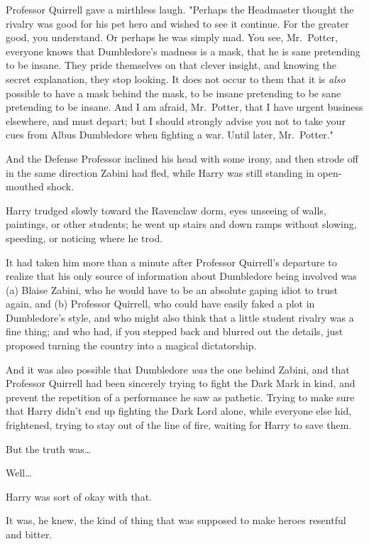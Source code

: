 Professor Quirrell gave a mirthless laugh. "Perhaps the Headmaster thought the
rivalry was good for his pet hero and wished to see it continue. For the
greater good, you understand. Or perhaps he was simply mad. You see,
Mr.~Potter, everyone knows that Dumbledore's madness is a mask, that he is sane
pretending to be insane. They pride themselves on that clever insight, and
knowing the secret explanation, they stop looking. It does not occur to them
that it is \emph{also} possible to have a mask behind the mask, to be insane
pretending to be sane pretending to be insane. And I am afraid, Mr.~Potter,
that I have urgent business elsewhere, and must depart; but I should strongly
advise you not to take your cues from Albus Dumbledore when fighting a war.
Until later, Mr.~Potter."

And the Defense Professor inclined his head with some irony, and then strode
off in the same direction Zabini had fled, while Harry was still standing in
open-mouthed shock.

Harry trudged slowly toward the Ravenclaw dorm, eyes unseeing of walls,
paintings, or other students; he went up stairs and down ramps without slowing,
speeding, or noticing where he trod.

It had taken him more than a minute after Professor Quirrell's departure to
realize that his only source of information about Dumbledore being involved was
(a) Blaise Zabini, who he would have to be an absolute gaping idiot to trust
again, and (b) Professor Quirrell, who could have easily faked a plot in
Dumbledore's style, and who might also think that a little student rivalry was
a fine thing; and who had, if you stepped back and blurred out the details,
just proposed turning the country into a magical dictatorship.

And it was also possible that Dumbledore \emph{was} the one behind Zabini, and
that Professor Quirrell had been sincerely trying to fight the Dark Mark in
kind, and prevent the repetition of a performance he saw as pathetic. Trying to
make sure that Harry didn't end up fighting the Dark Lord alone, while everyone
else hid, frightened, trying to stay out of the line of fire, waiting for Harry
to save them.

But the truth was{\ldots}

Well{\ldots}

Harry was sort of okay with that.

It was, he knew, the kind of thing that was supposed to make heroes resentful
and bitter.

